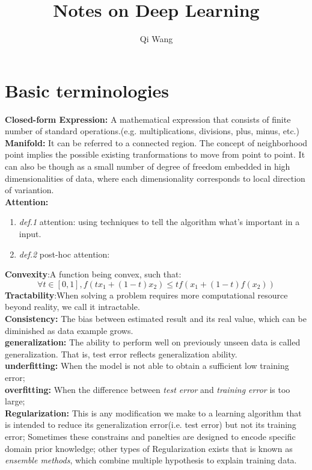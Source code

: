 \documentclass{article}
\author{Qi Wang}
\title{Notes on Deep Learning}
\begin{document}
\maketitle
\section{Basic terminologies}
\textbf{Closed-form Expression:} A mathematical expression that consists of finite number of standard operations.(e.g. multiplications, divisions, plus, minus, etc.)
\textbf{Manifold:}
It can be referred to a connected region. The concept of neighborhood point implies the possible existing tranformations to move from point to point. It can also be though as a small number of degree of freedom embedded in high dimensionalities of data, where each dimensionality corresponds to local direction of variantion. \\
\textbf{Attention:}
\begin{enumerate}
\item \textit{def.1} attention: using techniques to tell the algorithm what's important in a input.
\item \textit{def.2} post-hoc attention:
\end{enumerate}
\textbf{Convexity}:A function being convex, such that: $$\forall t \in [0,1], f(tx_{1}+(1-t)x_{2}) \leq tf(x_{1}+(1-t)f(x_{2})) $$
\textbf{Tractability}:When solving a problem requires more computational resource beyond reality, we call it intractable.\\
\textbf{Consistency:} The bias between estimated result and its real value, which can be diminished as data example grows.\\
\textbf{generalization:} The ability to perform well on previously unseen data is called generalization. That is, test error reflects generalization ability.\\
\textbf{underfitting:} When the model is not able to obtain a sufficient low training error;\\
\textbf{overfitting:} When the difference between \textit{test error} and \textit{training error} is too large;\\
\textbf{Regularization:} This is any modification we make to a learning algorithm that is intended to reduce its generalization error(i.e. test error) but not its training error; Sometimes these constrains and panelties are designed to encode specific domain prior knowledge; other types of Regularization exists that is known as \textit{ensemble methods}, which combine multiple hypothesis to explain training data.\\
\end{document}
